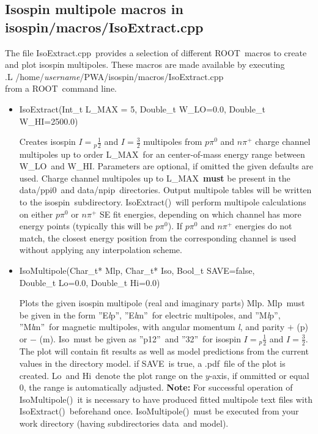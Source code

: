 \documentclass[a4paper,10pt]{article}
\def\tt{\ttfamily}
\def\rm{\rmfamily}
\begin{document}
\subsection{Isospin multipole macros in \tt isospin/macros/IsoExtract.cpp\rm}

The file \tt IsoExtract.cpp\rm\ provides a selection of different \tt ROOT\rm\ macros to create and plot isospin
multipoles. These macros are made available by executing\\
\tt .L /home/\textit{username}/PWA/isospin/macros/IsoExtract.cpp\rm\\
from a \tt ROOT\rm\ command line.

\begin{itemize}
\item
\tt IsoExtract(Int\_t L\_MAX = 5, Double\_t W\_LO=0.0, Double\_t W\_HI=2500.0)\rm

Creates isospin $I = {}_p\frac{1}{2}$ and $I = \frac{3}{2}$ multipoles from $p \pi^0$ and
$n \pi^+$ charge channel multipoles up to order \tt L\_MAX\rm\ for an center-of-mass energy range
between \tt W\_LO\rm\ and \tt W\_HI\rm. Parameters are optional, if omitted the given defaults are used.
Charge channel multipoles up to \tt L\_MAX\rm\ \textbf{must} be present in the 
\tt data/ppi0\rm\ and \tt data/npip\rm\ directories. Output multipole tables will be written to the 
\tt isospin\rm\ subdirectory.
\tt IsoExtract()\rm\ will perform multipole calculations on either $p \pi^0$ or $n \pi^+$
SE fit energies, depending on which channel has more energy points (typically this will be $p \pi^0$).
If $p \pi^0$ and $n \pi^+$ energies do not match, the closest energy position from the corresponding 
channel is used without applying any interpolation scheme.

\item
\tt IsoMultipole(Char\_t* Mlp, Char\_t* Iso, Bool\_t SAVE=false,\\
\phantom{IsoMultipole(}Double\_t Lo=0.0, Double\_t Hi=0.0)\rm

Plots the given isospin multipole (real and imaginary parts) \tt Mlp\rm.
\tt Mlp\rm\ must be given in the form \tt ''E\textit{l}p''\rm,
\tt ''E\textit{l}m''\rm\ 
for electric multipoles, and
\tt ''M\textit{l}p''\rm,
\tt ''M\textit{l}m''\rm\ 
for magnetic multipoles, with angular momentum \tt\textit{l}\rm, and parity
$+$ (\tt p\rm) or $-$ (\tt m\rm). \tt Iso\rm\ must be given as \tt ''p12''\rm\ and \tt ''32''\rm\
for isospin $I = {}_p\frac{1}{2}$ and $I = \frac{3}{2}$.
The plot will contain fit results as well as model predictions from the current
values in the directory \tt model\rm.
if \tt SAVE\rm\ is true, a \tt.pdf\rm\ file of the plot is created. \tt Lo\rm\ and \tt Hi\rm\ denote the plot range on the $y$-axis, 
if ommitted or equal 0, the range is automatically adjusted.
\textbf{Note:} For successful operation of \tt IsoMultipole()\rm\ it is necessary to have produced
fitted multipole text files with \tt IsoExtract()\rm\ beforehand once. \tt IsoMultipole()\rm\ must be executed from your
work directory (having subdirectories \tt data\rm\ and \tt model\rm).
\end{itemize}
\end{document}
